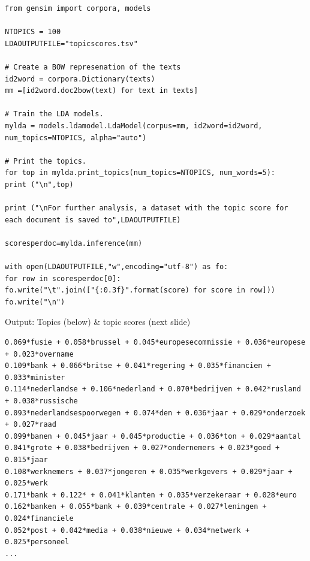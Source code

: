 \documentclass{beamer}
\begin{document}
\begin{frame}
\begin{lstlisting}
from gensim import corpora, models

NTOPICS = 100
LDAOUTPUTFILE="topicscores.tsv"

# Create a BOW represenation of the texts
id2word = corpora.Dictionary(texts)
mm =[id2word.doc2bow(text) for text in texts]

# Train the LDA models.
mylda = models.ldamodel.LdaModel(corpus=mm, id2word=id2word, num_topics=NTOPICS, alpha="auto")

# Print the topics.
for top in mylda.print_topics(num_topics=NTOPICS, num_words=5):
print ("\n",top)

print ("\nFor further analysis, a dataset with the topic score for each document is saved to",LDAOUTPUTFILE)

scoresperdoc=mylda.inference(mm)

with open(LDAOUTPUTFILE,"w",encoding="utf-8") as fo:
for row in scoresperdoc[0]:
fo.write("\t".join(["{:0.3f}".format(score) for score in row]))
fo.write("\n")
\end{lstlisting}

\end{frame}


\begin{frame}[fragile]{Output: Topics (below) \& topic scores (next slide)}
\begin{lstlisting}
0.069*fusie + 0.058*brussel + 0.045*europesecommissie + 0.036*europese + 0.023*overname
0.109*bank + 0.066*britse + 0.041*regering + 0.035*financien + 0.033*minister
0.114*nederlandse + 0.106*nederland + 0.070*bedrijven + 0.042*rusland + 0.038*russische
0.093*nederlandsespoorwegen + 0.074*den + 0.036*jaar + 0.029*onderzoek + 0.027*raad
0.099*banen + 0.045*jaar + 0.045*productie + 0.036*ton + 0.029*aantal
0.041*grote + 0.038*bedrijven + 0.027*ondernemers + 0.023*goed + 0.015*jaar
0.108*werknemers + 0.037*jongeren + 0.035*werkgevers + 0.029*jaar + 0.025*werk
0.171*bank + 0.122* + 0.041*klanten + 0.035*verzekeraar + 0.028*euro
0.162*banken + 0.055*bank + 0.039*centrale + 0.027*leningen + 0.024*financiele
0.052*post + 0.042*media + 0.038*nieuwe + 0.034*netwerk + 0.025*personeel
...
\end{lstlisting}
\end{frame}


\begin{frame}[plain]
\end{frame}
\end{document}
